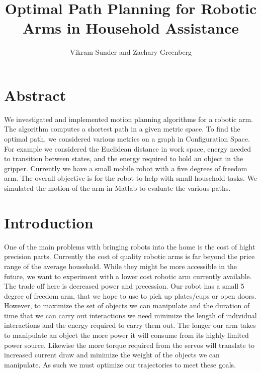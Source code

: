 \documentclass{article}
\title{Optimal Path Planning for Robotic Arms in Household Assistance}
\author{Vikram Sunder and Zachary Greenberg}
\begin{document}
\maketitle

\section{Abstract}
We investigated and implemented motion planning algorithms for a robotic arm. The algorithm computes a shortest path in a given metric space.  To find the optimal path, we considered various metrics on a graph in Configuration Space. For example we considered the Euclidean distance in work space, energy needed to transition between states, and the energy required to hold an object in the gripper. Currently we have a small mobile robot with a five degrees of freedom arm. The overall objective is for the robot to help with small household tasks. We simulated the motion of the arm in Matlab to evaluate the various paths. 

\section{Introduction}
One of the main problems with bringing robots into the home is the cost of hight precision parts. Currently the cost of quality robotic arms is far beyond the price range of the average household. While they might be more accessible in the future, we want to experiment with a lower cost robotic arm currently available. The trade off here is decreased power and precession. Our robot has a small 5 degree of freedom arm, that we hope to use to pick up plates/cups or open doors. However, to maximize the set of objects we can manipulate and the duration of time that we can carry out interactions we need minimize the length of individual interactions and the energy required to carry them out.  The longer our arm takes to manipulate an object the more power it will consume from its highly limited power source.  Likewise the more torque required from the servos will translate to increased current draw and minimize the weight of the objects we can manipulate.  As such we must optimize our trajectories to meet these goals.  
\end{document}
